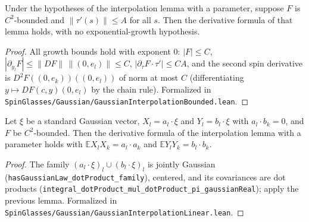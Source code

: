 \begin{lemma}\label{lem:sg-tal:perceptron-interpolation-bounded}
  \leanok
Under the hypotheses of the interpolation lemma with a parameter, suppose $F$ is $C^2$-bounded and $\|\tau'(s)\|\le A$ for all $s$. Then the derivative formula of that lemma holds, with no exponential-growth hypothesis.
\end{lemma}
\begin{proof}
  \leanok
All growth bounds hold with exponent $0$: $|F|\le C$, $|\partial_{y_l}F|\le\|DF\|\,\|(0,e_l)\|\le C$, $|\partial_\tau F\cdot\tau'|\le CA$, and the second spin derivative is $D^2F((0,e_k))((0,e_l))$ of norm at most $C$ (differentiating $y\mapsto DF(c,y)(0,e_l)$ by the chain rule).
Formalized in \texttt{SpinGlasses/Gaussian/GaussianInterpolationBounded.lean}.
\end{proof}

\begin{lemma}\label{lem:sg-tal:perceptron-interpolation-linear}
  \leanok
Let $\xi$ be a standard Gaussian vector, $X_l=a_l\cdot\xi$ and $Y_l=b_l\cdot\xi$ with $a_l\cdot b_k=0$, and $F$ be $C^2$-bounded. Then the derivative formula of the interpolation lemma with a parameter holds with $\mathbb E X_lX_k=a_l\cdot a_k$ and $\mathbb E Y_lY_k=b_l\cdot b_k$.
\end{lemma}
\begin{proof}
  \leanok
The family $(a_l\cdot\xi)_l\cup(b_l\cdot\xi)_l$ is jointly Gaussian (\texttt{hasGaussianLaw\_dotProduct\_family}), centered, and its covariances are dot products (\texttt{integral\_dotProduct\_mul\_dotProduct\_pi\_gaussianReal}); apply the previous lemma.
Formalized in \texttt{SpinGlasses/Gaussian/GaussianInterpolationLinear.lean}.
\end{proof}

